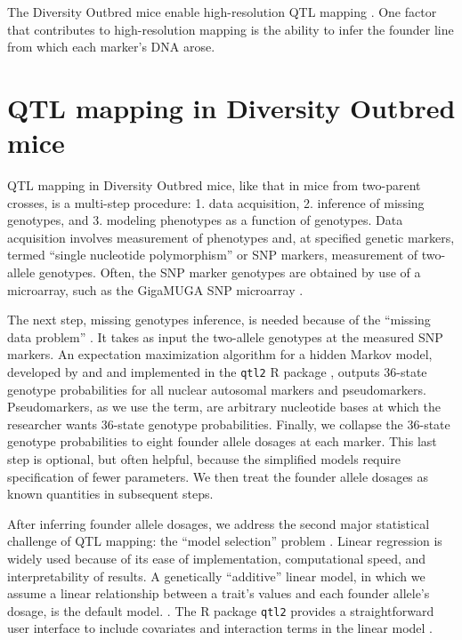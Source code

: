 \documentclass[oneside]{book}\usepackage[]{graphicx}\usepackage[]{color}
\begin{document}
The Diversity Outbred mice enable high-resolution QTL mapping \citep{gatti2014quantitative}. One factor that contributes to high-resolution mapping is the ability to infer the founder line from which each marker's DNA arose. 




\section{QTL mapping in Diversity Outbred mice}\label{sec:do-qtl}

QTL mapping in Diversity Outbred mice, like that in mice from two-parent crosses, is a multi-step procedure: 1. data acquisition, 2. inference of missing genotypes, and 3. modeling phenotypes as a function of genotypes. Data acquisition involves measurement of phenotypes and, at specified genetic markers, termed ``single nucleotide polymorphism'' or SNP markers, measurement of two-allele genotypes. Often, the SNP marker genotypes are obtained by use of a microarray, such as the GigaMUGA SNP microarray \citep{morgan2015mouse}. 

The next step, missing genotypes inference, is needed because of the ``missing data problem'' \citep{broman2009guide}. It takes as input the two-allele genotypes at the measured SNP markers. An expectation maximization algorithm \citep{dempster1977maximum} for a hidden Markov model, developed by \citet{broman2012haplotype} and \citet{broman2012genotype} and implemented in the \texttt{qtl2} R package \citep{broman2019rqtl2}, outputs 36-state genotype probabilities for all nuclear autosomal markers and pseudomarkers. Pseudomarkers, as we use the term, are arbitrary nucleotide bases at which the researcher wants 36-state genotype probabilities. Finally, we collapse the 36-state genotype probabilities to eight founder allele dosages at each marker. This last step is optional, but often helpful, because the simplified models require specification of fewer parameters. We then treat the founder allele dosages as known quantities in subsequent steps. 


After inferring founder allele dosages, we address the second major statistical challenge of 
QTL mapping: the ``model selection'' problem \citep{broman2009guide}.
Linear regression is widely used because of its ease of implementation,
computational speed, and interpretability of results.
A genetically ``additive'' linear model, in which we assume a linear relationship between
a trait's values and each founder allele's dosage, is the default model.
\citep{gatti2014quantitative,broman2019rqtl2}.
The R package \texttt{qtl2} provides a straightforward user
interface to include covariates and interaction terms in the linear model \citep{broman2019rqtl2}.
\end{document}
